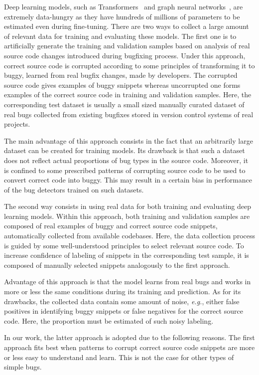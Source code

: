 \documentclass[10pt,conference]{IEEEtran}
\begin{document}
Deep learning models, such as Transformers~\cite{vaswani2017attention} and graph neural networks~\cite{zhou2021graph}, are extremely data-hungry as they have hundreds of millions of parameters to be estimated even during fine-tuning.
There are two ways to collect a large amount of relevant data for training and evaluating these models. The first one is to artificially generate the training and validation samples based on analysis of real source code changes
introduced during bugfixing process. Under this approach, correct source code is corrupted according to some principles of transforming it to buggy, learned from real bugfix changes, made by developers. The corrupted source code 
gives examples of buggy snippets whereas uncorrupted one forms examples of the correct source code  in training and validation samples. Here, the corresponding test dataset is usually a small sized manually
curated dataset of real bugs collected from existing bugfixes stored in version control systems of real projects. 

The main advantage of this approach consists in the fact that an arbitrarily large dataset can be created for training models.
Its drawback is that such a dataset does not reflect actual proportions of bug types in the source code. Moreover, it is confined to some prescribed patterns of corrupting source code to be used to convert correct code into buggy. 
This may result in a certain bias in performance of the bug detectors trained on such datasets.

The second way consists in using real data for
both training and evaluating deep learning models.
Within this approach, both training and validation samples are composed of real examples of buggy and correct source code snippets, automatically collected from available codebases. Here, the data collection process is guided
by some well-understood principles to select relevant source code. To increase confidence of labeling of snippets in the corresponding test sample, it is composed of manually selected snippets analogously to the first approach.

Advantage of this approach is that the model learns from real bugs and works in more or less the same conditions during its training and prediction. As for its drawbacks,
the collected data contain some amount of noise, \textit{e.g.}, either false positives in identifying buggy snippets or false negatives for the correct source code. Here, the proportion must be estimated of such noisy labeling.

In our work, the latter approach is adopted due to the following reasons. The first approach fits best when patterns to corrupt correct source code snippets are more or less 
easy to understand and learn.
This is not the case for other types of simple bugs. 
\end{document}
